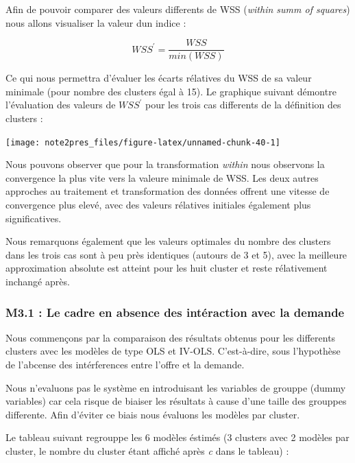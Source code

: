 \documentclass[11pt,]{article}
\begin{document}
Afin de pouvoir comparer des valeurs differents de WSS (\emph{within
summ of squares}) nous allons visualiser la valeur dun indice :

\begin{equation*}
    WSS^{'} = \frac{WSS}{min(WSS)}
\end{equation*}

Ce qui nous permettra d'évaluer les écarts rélatives du WSS de sa valeur
minimale (pour nombre des clusters égal à 15). Le graphique suivant
démontre l'évaluation des valeurs de \(WSS^{'}\) pour les trois cas
differents de la définition des clusters :

\FloatBarrier

\begin{center}\texttt{[image: note2pres\_files/figure-latex/unnamed-chunk-40-1]} \end{center}

\FloatBarrier

Nous pouvons observer que pour la transformation \emph{within} nous
observons la convergence la plus vite vers la valeure minimale de WSS.
Les deux autres approches au traitement et transformation des données
offrent une vitesse de convergence plus elevé, avec des valeurs
rélatives initiales également plus significatives.

Nous remarquons également que les valeurs optimales du nombre des
clusters dans les trois cas sont à peu près identiques (autours de 3 et
5), avec la meilleure approximation absolute est atteint pour les huit
cluster et reste rélativement inchangé après.

\hypertarget{m3.1-le-cadre-en-absence-des-interaction-avec-la-demande}{%
\subsubsection{M3.1 : Le cadre en absence des intéraction avec la
demande}\label{m3.1-le-cadre-en-absence-des-interaction-avec-la-demande}}

Nous commençons par la comparaison des résultats obtenus pour les
differents clusters avec les modèles de type OLS et IV-OLS.
C'est-à-dire, sous l'hypothèse de l'abcense des intérferences entre
l'offre et la demande.

Nous n'evaluons pas le système en introduisant les variables de grouppe
(dummy variables) car cela risque de biaiser les résultats à cause d'une
taille des grouppes differente. Afin d'éviter ce biais nous évaluons les
modèles par cluster.

Le tableau suivant regrouppe les 6 modèles éstimés (3 clusters avec 2
modèles par cluster, le nombre du cluster étant affiché après \emph{c}
dans le tableau) :
\end{document}
